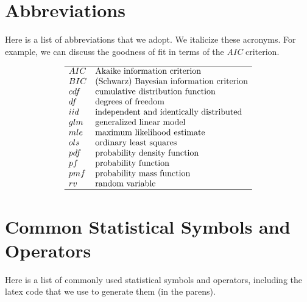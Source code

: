\documentclass[]{book}
\theoremstyle{definition}
\theoremstyle{definition}
\theoremstyle{definition}
\theoremstyle{remark}
\begin{document}
\section{Abbreviations}\label{S:Abbreviations}

Here is a list of abbreviations that we adopt. We italicize these
acronyms. For example, we can discuss the goodness of fit in terms of
the \emph{AIC} criterion.

\[
\begin{array}{ll}
\hline
AIC & \text{Akaike information criterion} \\
BIC & \text{(Schwarz) Bayesian information criterion} \\
cdf & \text{cumulative distribution function} \\
df & \text{degrees of freedom} \\
iid & \text{independent and identically distributed} \\
glm & \text{generalized linear model} \\
mle & \text{maximum likelihood estimate}\\
ols & \text{ordinary least squares} \\
pdf & \text{probability density function} \\
pf  & \text{probability  function} \\
pmf & \text{probability mass function} \\
rv & \text{random variable} \\ \hline
\end{array}
\]

\section{Common Statistical Symbols and Operators}\label{S:StatSymbols}

Here is a list of commonly used statistical symbols and operators,
including the latex code that we use to generate them (in the parens).
\end{document}
